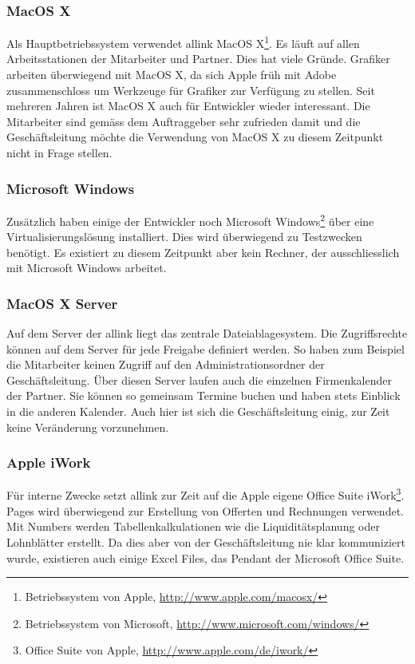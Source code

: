 \subsubsection{MacOS X}
Als Hauptbetriebssystem verwendet allink MacOS X\footnote{Betriebssystem von Apple, \url{http://www.apple.com/macosx/}}.
Es läuft auf allen Arbeitsstationen der Mitarbeiter und Partner. Dies hat
viele Gründe. Grafiker arbeiten überwiegend mit MacOS X, da sich Apple
früh mit Adobe zusammenschloss um Werkzeuge für Grafiker zur Verfügung zu stellen.
Seit mehreren Jahren ist MacOS X auch für Entwickler wieder interessant. Die 
Mitarbeiter sind gemäss dem Auftraggeber sehr zufrieden damit und die Geschäftsleitung 
möchte die Verwendung von MacOS X zu diesem Zeitpunkt nicht in Frage stellen.

\subsubsection{Microsoft Windows}
Zusätzlich haben einige der Entwickler noch Microsoft Windows\footnote{Betriebssystem von Microsoft, \url{http://www.microsoft.com/windows/}}
über eine Virtualisierungslösung installiert. Dies wird überwiegend zu Testzwecken 
benötigt. Es existiert zu diesem Zeitpunkt aber kein Rechner, der ausschliesslich
mit Microsoft Windows arbeitet.

\subsubsection{MacOS X Server}
Auf dem Server der allink liegt das zentrale Dateiablagesystem. Die Zugriffsrechte können
auf dem Server für jede Freigabe definiert werden. So haben zum Beispiel
die Mitarbeiter keinen Zugriff auf den Administrationsordner der Geschäftsleitung.
Über diesen Server laufen auch die einzelnen Firmenkalender der Partner. Sie
können so gemeinsam Termine buchen und haben stets Einblick in die anderen
Kalender. Auch hier ist sich die Geschäftsleitung einig, zur Zeit keine 
Veränderung vorzunehmen.

\subsubsection{Apple iWork}
Für interne Zwecke setzt allink zur Zeit auf die Apple eigene Office Suite iWork\footnote{Office Suite von Apple, \url{http://www.apple.com/de/iwork/}}.
Pages wird überwiegend zur Erstellung von Offerten und Rechnungen verwendet. Mit Numbers
werden Tabellenkalkulationen wie die Liquiditätsplanung oder Lohnblätter erstellt.
Da dies aber von der Geschäftsleitung nie klar kommuniziert wurde, existieren
auch einige Excel Files, das Pendant der Microsoft Office Suite.

